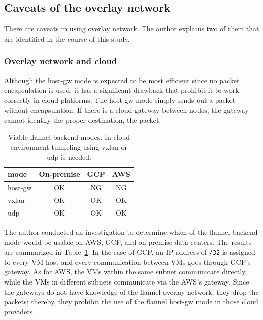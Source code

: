 \FloatBarrier

\subsection{Caveats of the overlay network}

There are caveats in using overlay network.
The author explains two of them that are identified in the course of this study.

\subsubsection{Overlay network and cloud}

Although the host-gw mode is expected to be most efficient since no packet encapsulation is used, it has a significant drawback that prohibit it to work correctly in cloud platforms. 
The host-gw mode simply sends out a packet without encapsulation.
If there is a cloud gateway between nodes, the gateway cannot identify the proper destination,  the packet.

\begin{table}
  \centering
  \begin{tabular}{lccc}
    \toprule
    mode & On-premise & GCP & AWS \\
    \midrule
    host-gw & OK & NG & NG \\
    vxlan & OK & OK & OK \\
    udp & OK & OK & OK \\
    \bottomrule
\end{tabular}

  \caption{Viable flannel backend modes. In cloud environment tunneling using vxlan or udp is needed.}
  \label{tab:Viable flannel backends}
\end{table}

The author conducted an investigation to determine which of the flannel backend mode would be usable on AWS, GCP, and on-premise data centers.
The results are summarized in Table~\ref{tab:Viable flannel backends}. 
In the case of GCP, an IP address of {\tt /32} is assigned to every VM host and 
every communication between VMs goes through GCP's gateway.
As for AWS, the VMs within the same subnet communicate directly, while the VMs in different subnets communicate via the AWS's gateway.
Since the gateways do not have knowledge of the flannel overlay network, they drop the packets; thereby, 
they prohibit the use of the flannel host-gw mode in those cloud providers.  

